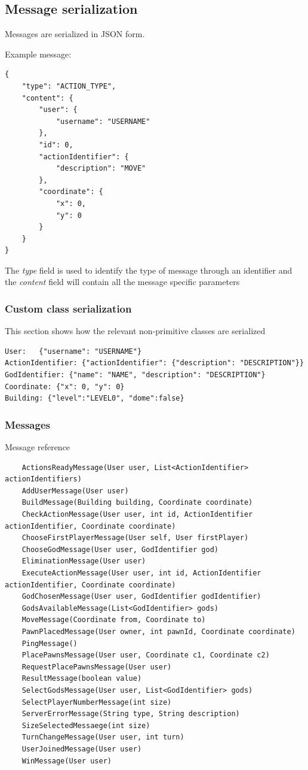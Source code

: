 \documentclass{article}
\begin{document}
\pagebreak
\subsection*{Message serialization}

Messages are serialized in JSON form.

\vspace{8pt}

Example message:
\begin{lstlisting}
{
    "type": "ACTION_TYPE",
    "content": {
        "user": {
            "username": "USERNAME"
        },
        "id": 0,
        "actionIdentifier": {
            "description": "MOVE"
        },
        "coordinate": {
            "x": 0,
            "y": 0
        }
    }
}
\end{lstlisting}

The \emph{type} field is used to identify the type of message through an identifier and the \emph{content} field will contain all the message specific parameters

\subsubsection*{Custom class serialization}

This section shows how the relevant non-primitive classes are serialized
\begin{lstlisting}
User:	{"username": "USERNAME"}
ActionIdentifier: {"actionIdentifier": {"description": "DESCRIPTION"}}
GodIdentifier: {"name": "NAME", "description": "DESCRIPTION"}
Coordinate: {"x": 0, "y": 0}
Building: {"level":"LEVEL0", "dome":false}
\end{lstlisting}

\subsubsection*{Messages}
Message reference
\begin{lstlisting}
    ActionsReadyMessage(User user, List<ActionIdentifier> actionIdentifiers)
    AddUserMessage(User user)
    BuildMessage(Building building, Coordinate coordinate)
    CheckActionMessage(User user, int id, ActionIdentifier actionIdentifier, Coordinate coordinate)
    ChooseFirstPlayerMessage(User self, User firstPlayer)
    ChooseGodMessage(User user, GodIdentifier god)
    EliminationMessage(User user)
    ExecuteActionMessage(User user, int id, ActionIdentifier actionIdentifier, Coordinate coordinate)
    GodChosenMessage(User user, GodIdentifier godIdentifier)
    GodsAvailableMessage(List<GodIdentifier> gods)
    MoveMessage(Coordinate from, Coordinate to)
    PawnPlacedMessage(User owner, int pawnId, Coordinate coordinate)
    PingMessage()
    PlacePawnsMessage(User user, Coordinate c1, Coordinate c2)
    RequestPlacePawnsMessage(User user)
    ResultMessage(boolean value)
    SelectGodsMessage(User user, List<GodIdentifier> gods)
    SelectPlayerNumberMessage(int size)
    ServerErrorMessage(String type, String description)
    SizeSelectedMessaege(int size)
    TurnChangeMessage(User user, int turn)
    UserJoinedMessage(User user)
    WinMessage(User user)
\end{lstlisting}
\end{document}
